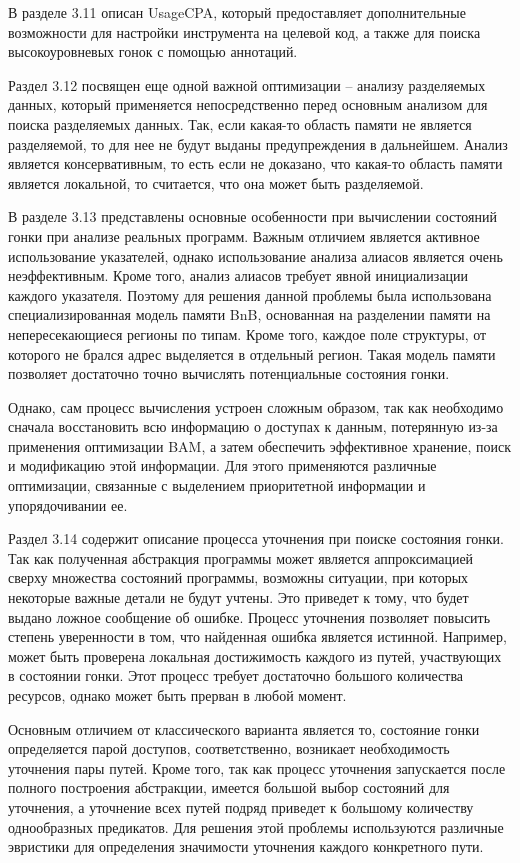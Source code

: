 В разделе 3.11 описан UsageCPA, который предоставляет дополнительные возможности для настройки инструмента на целевой код, а также для поиска высокоуровневых гонок с помощью аннотаций.

Раздел 3.12 посвящен еще одной важной оптимизации -- анализу разделяемых данных, который применяется непосредственно перед основным анализом для поиска разделяемых данных.
Так, если какая-то область памяти не является разделяемой, то для нее не будут выданы предупреждения в дальнейшем.
Анализ является консервативным, то есть если не доказано, что какая-то область памяти является локальной, то считается, что она может быть разделяемой.

В разделе 3.13 представлены основные особенности при вычислении состояний гонки при анализе реальных программ.
Важным отличием является активное использование указателей, однако использование анализа алиасов является очень неэффективным.
Кроме того, анализ алиасов требует явной инициализации каждого указателя. Поэтому для решения данной проблемы была использована специализированная модель памяти BnB, основанная на разделении памяти на непересекающиеся регионы по типам.
Кроме того, каждое поле структуры, от которого не брался адрес выделяется в отдельный регион.
Такая модель памяти позволяет достаточно точно вычислять потенциальные состояния гонки.

Однако, сам процесс вычисления устроен сложным образом, так как необходимо сначала восстановить всю информацию о доступах к данным, потерянную из-за применения оптимизации BAM, а затем обеспечить эффективное хранение, поиск и модификацию этой информации.
Для этого применяются различные оптимизации, связанные с выделением приоритетной информации и упорядочивании ее. 

Раздел 3.14 содержит описание процесса уточнения при поиске состояния гонки.
Так как полученная абстракция программы может является аппроксимацией сверху множества состояний программы, возможны ситуации, при которых некоторые важные детали не будут учтены. 
Это приведет к тому, что будет выдано ложное сообщение об ошибке. 
Процесс уточнения позволяет повысить степень уверенности в том, что найденная ошибка является истинной.
Например, может быть проверена локальная достижимость каждого из путей, участвующих в состоянии гонки.
Этот процесс требует достаточно большого количества ресурсов, однако может быть прерван в любой момент.

Основным отличием от классического варианта является то, состояние гонки определяется парой доступов, соответственно, возникает необходимость уточнения пары путей.
Кроме того, так как процесс уточнения запускается после полного построения абстракции, имеется большой выбор состояний для уточнения, а уточнение всех путей подряд приведет к большому количеству однообразных предикатов.
Для решения этой проблемы используются различные эвристики для определения значимости уточнения каждого конкретного пути.


